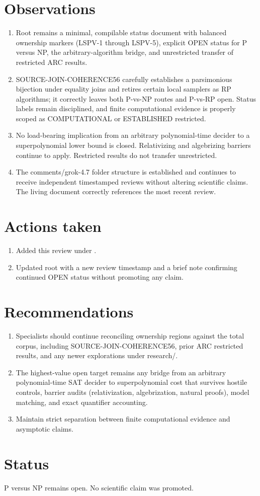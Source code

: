 \documentclass[11pt]{article}
\begin{document}
\section{Observations}
\begin{enumerate}
\item Root  remains a minimal, compilable status document with balanced ownership markers (LSPV-1 through LSPV-5), explicit OPEN status for P versus NP, the arbitrary-algorithm bridge, and unrestricted transfer of restricted ARC results.
\item SOURCE-JOIN-COHERENCE56 carefully establishes a parsimonious bijection under equality joins and retires certain local samplers as RP algorithms; it correctly leaves both P-vs-NP routes and P-vs-RP open. Status labels remain disciplined, and finite computational evidence is properly scoped as COMPUTATIONAL or ESTABLISHED restricted.
\item No load-bearing implication from an arbitrary polynomial-time decider to a superpolynomial lower bound is closed. Relativizing and algebrizing barriers continue to apply. Restricted results do not transfer unrestricted.
\item The comments/grok-4.7 folder structure is established and continues to receive independent timestamped reviews without altering scientific claims. The living document correctly references the most recent review.
\end{enumerate}

\section{Actions taken}
\begin{enumerate}
\item Added this review under .
\item Updated root  with a new review timestamp and a brief note confirming continued OPEN status without promoting any claim.
\end{enumerate}

\section{Recommendations}
\begin{enumerate}
\item Specialists should continue reconciling ownership regions against the total corpus, including SOURCE-JOIN-COHERENCE56, prior ARC restricted results, and any newer explorations under research/.
\item The highest-value open target remains any bridge from an arbitrary polynomial-time SAT decider to superpolynomial cost that survives hostile controls, barrier audits (relativization, algebrization, natural proofs), model matching, and exact quantifier accounting.
\item Maintain strict separation between finite computational evidence and asymptotic claims.
\end{enumerate}

\section{Status}
P versus NP remains open. No scientific claim was promoted.

\end{document}
